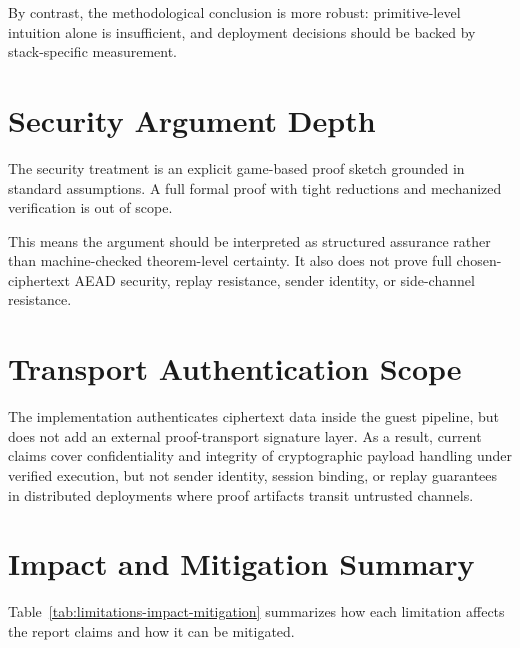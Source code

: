 By contrast, the methodological conclusion is more robust: primitive-level
intuition alone is insufficient, and deployment decisions should be backed by
stack-specific measurement.

\section{Security Argument Depth}

The security treatment is an explicit game-based proof sketch grounded in
standard assumptions. A full formal proof with tight reductions and mechanized
verification is out of scope.

This means the argument should be interpreted as structured assurance rather than
machine-checked theorem-level certainty. It also does not prove full
chosen-ciphertext AEAD security, replay resistance, sender identity, or
side-channel resistance.

\section{Transport Authentication Scope}

The implementation authenticates ciphertext data inside the guest pipeline, but
does not add an external proof-transport signature layer. As a result, current
claims cover confidentiality and integrity of cryptographic payload handling
under verified execution, but not sender identity, session binding, or replay
guarantees in distributed deployments where proof artifacts transit untrusted
channels.

\section{Impact and Mitigation Summary}

Table~\ref{tab:limitations-impact-mitigation} summarizes how each limitation
affects the report claims and how it can be mitigated.

